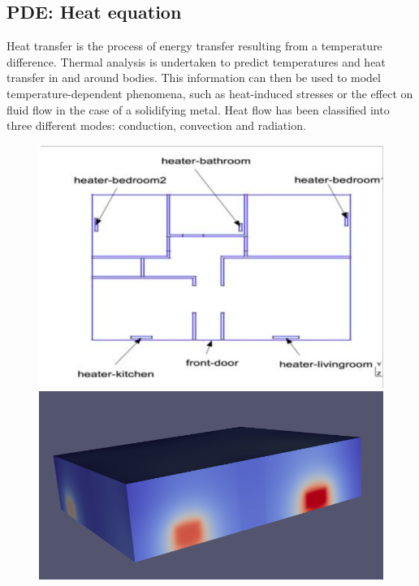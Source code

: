 \documentclass[12pt]{article}
\begin{document}
	\subsection{PDE: Heat equation}
	\noindent Heat transfer is the process of energy transfer resulting from a temperature difference. 
	\newline
    \noindent Thermal analysis is undertaken to predict temperatures and heat transfer in and around bodies. This information can then be used to model temperature-dependent phenomena, such as heat-induced stresses or the effect on fluid flow in the case of a solidifying metal.  Heat flow has been classified into three different modes: conduction, convection and radiation.
    \begin{figure}[H]       
	\begin{minipage}[t]{0.45\linewidth}
		\centering
		\includegraphics[width=\linewidth]{"images/Diff_equation/heat_1.png"}
	\end{minipage} \hfill
	\begin{minipage}[t]{0.50\linewidth}
		\centering
		\includegraphics[width=\linewidth]{"images/Diff_equation/heat_2.png"}
	\end{minipage}
    \end{figure}
\end{document}
